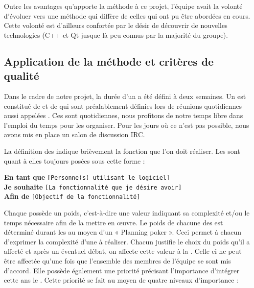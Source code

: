 Outre les avantages qu'apporte la méthode  à ce projet, l'équipe avait la volonté d’évoluer vers une méthode qui diffère de celles qui ont pu
être abordées en cours. Cette volonté est d’ailleurs confortée par le désir de découvrir  de nouvelles technologies (C++ et Qt jusque-là peu connus
par la majorité du groupe). 


\subsection{Application de la méthode  et critères de qualité}
Dans le cadre de notre projet, la durée d'un  a été défini à deux semaines. Un  est constitué de  et de 
 qui sont préalablement définies lors de réunions quotidiennes aussi appelées . Ces  sont quotidiennes, nous
profitons de notre temps libre dans l’emploi du temps pour les organiser. Pour les jours où ce n’est pas possible, nous avons mis en place un salon
de discussion IRC.  

La définition des  indique brièvement la fonction que l'on doit réaliser. Les  sont quant à elles toujours posées
sous cette forme :

\begin{exemple}
	\textbf{En tant que} \texttt{[Personne(s) utilisant le logiciel]}\\
	\textbf{Je souhaite} \texttt{[La fonctionnalité que je désire avoir]}\\
	\textbf{Afin de} \texttt{[Objectif de la fonctionnalité]}
\end{exemple}

Chaque  possède un poids, c'est-à-dire une valeur indiquant sa complexité et/ou le temps nécessaire afin de la mettre en œuvre. Le poids de
chacune des  est déterminé durant les  au moyen d’un « Planning poker ». Ceci permet à chacun d’exprimer la complexité d’une
 à réaliser. Chacun justifie le choix du poids qu'il a affecté et après un éventuel débat, on affecte cette valeur à la . Celle-ci ne
peut être affectée qu'une fois que l'ensemble des membres de l'équipe se sont mis d’accord. Elle possède également une priorité précisant
l'importance d’intégrer cette  ans le . Cette priorité se fait au moyen de quatre niveaux d’importance : 

